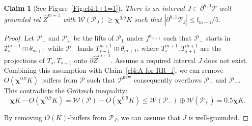 \documentclass{amsart}
\newcommand{\1}{{\mathbb 1 }}
\newcommand{\Width}{{\mathcal W}}
\newcommand{\wZ}{{\widehat Z}}
\newcommand{\qq}{\mathfrak{q}}
\newcommand{\length}{{\mathfrak l}}
\newcommand\PP{\mathcal{P}}
\newcommand\new{{\operatorname{new}}}
\newtheorem{claim4}{Claim}
\theoremstyle{remark}
\numberwithin{equation}{section}
\theoremstyle{definition}
\newcommand{\bchi}{{\boldsymbol{ \chi}}}
\begin{document}
\begin{claim4}[See Figure~\ref{Fig:cl4:1+1=1}]
\label{cl4:1+1=1}There is an interval $J\subset \partial ^{h,0} \PP$ well-grounded rel $\wZ^{m+1}$ with $\Width(\PP_{J})\ge \bchi^{0.9}K$ such that $|\partial^{h,1} \PP_{J} |\le \length_{m+1}/5$.
\end{claim4}
\begin{proof}Let $\PP_-$ and $\PP_+$ be the lifts of $\PP_1$ under $f^{\qq_{m+1}}$ such that $\PP_-$ starts in $T^{m+1}_s\boxplus \theta_{m+1}$ while $\PP_+$ lands $T^{m+1}_{s+1}\boxplus \theta_{m+1}$, where $T^{m+1}_s, T^{m+1}_{s+1}$ are the projections of $T_s, T_{s+1}$ onto $\partial \wZ^{m+1}$. Assume a required interval $J$ does not exist. Combining this assumption with Claim~\ref{cl4:A for RR_i}, we can remove $O(\bchi^{0.9}K)$ buffers from $\PP$ such that $\PP^\new$ consequently overflows $\PP_-$ and $\PP_+$.  This contradicts the Gr\"otzsch inequality:
\[\bchi K -O(\bchi^{0.9}K ) =\Width(\PP) -O(\bchi^{0.9}K )\le \Width(\PP_-) \oplus \Width(\PP_+)= 0.5 \bchi K.\] 

By removing $O(K)$-buffers from $\PP_J$, we can assume that $J$ is well-grounded.
\end{proof}

 
\end{document}
